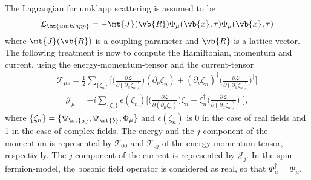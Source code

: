 %
The Lagrangian for umklapp scattering is assumed to be 
%
\begin{align}
	\mathcal{L}_{\mt{umklapp}}= -\mt{J}(\vb{R}) \Phi_{\mu}(\vb{x},\tau) \Phi_{\mu}(\vb{x},\tau)
\end{align}
%
where $\mt{J}(\vb{R})$ is a coupling parameter and $\vb{R}$ is a lattice vector.
The following treatment is now to compute the Hamiltonian, momentum and current, using the energy-momentum-tensor and the current-tensor
%
\begin{align}
	\mathcal{T}_{\mu\nu} = 
		\frac{1}{2} \sum\limits_{\{\zeta_{n}\}} \bigg[ 
		\Big(\frac{\partial\mathcal{L}}{\partial(\partial_{\mu}\zeta_{n})}\Big) (\partial_{\nu}\zeta_{n}) 
		+
		(\partial_{\nu}\zeta_{n})^{\dag} \Big(\frac{\partial\mathcal{L}}{\partial(\partial_{\mu}\zeta_{n})}\Big)^{\dag}
		\bigg]
\end{align}
%
%
\begin{align}
	\mathcal{J}_{\mu} = -i \sum\limits_{\{\zeta_{n}\}} \epsilon(\zeta_{n}) \bigg[
		\Big(\frac{\partial\mathcal{L}}{\partial(\partial_{\mu}\zeta_{n})}\Big) \zeta_{n}
		-
		\zeta_{n}^{\dag} \Big(\frac{\partial\mathcal{L}}{\partial(\partial_{\mu}\zeta_{n})}\Big)^{\dag}
		\bigg],
\end{align}
%
where $\{\zeta_{n}\} = \{\Psi_{\mt{a}},\Psi_{\mt{b}}, \Phi_{\mu}\}$ and $\epsilon(\zeta_{n})$ is 0 in the case of real fields and 1 in the case of complex fields.
The energy and the $j$-component of the momentum is represented by $\mathcal{T}_{00}$ and $\mathcal{T}_{0j}$ of the energy-momentum-tensor, respectivily.
The $j$-component of the current is represented by $\mathcal{J}_{j}$.
In the spin-fermion-model, the bosonic field operator is considered as real, so that $\Phi_{\mu}^{\dag} = \Phi_{\mu}$.



%
%








